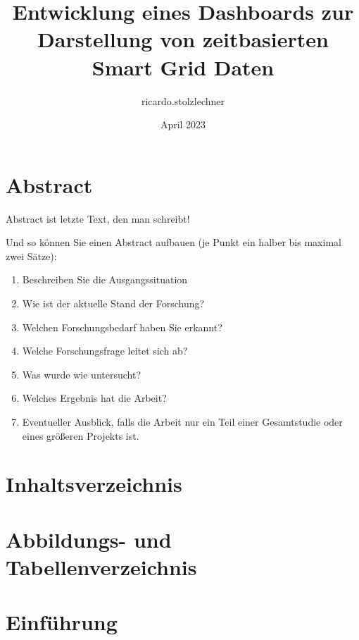 \documentclass{article}
\title{Entwicklung eines Dashboards zur Darstellung von zeitbasierten Smart Grid Daten}
\author{ricardo.stolzlechner }
\date{April 2023}
\begin{document}
\maketitle

\section{Abstract}
Abstract ist letzte Text, den man schreibt!

Und so können Sie einen Abstract aufbauen (je Punkt ein halber bis maximal zwei Sätze):

\begin{enumerate}
    \item Beschreiben Sie die Ausgangssituation
    \item Wie ist der aktuelle Stand der Forschung?
    \item Welchen Forschungsbedarf haben Sie erkannt?
    \item Welche Forschungsfrage leitet sich ab?
    \item Was wurde wie untersucht?
    \item Welches Ergebnis hat die Arbeit?
    \item Eventueller Ausblick, falls die Arbeit nur ein Teil einer Gesamtstudie oder eines größeren Projekts ist.
\end{enumerate}


\section{Inhaltsverzeichnis}

\section{Abbildungs- und Tabellenverzeichnis}

\section{Einführung}
\end{document}
